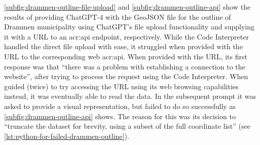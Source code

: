 \autoref{subfig:drammen-outline-file-upload} and \autoref{subfig:drammen-outline-api} show the results of providing ChatGPT-4 with the GeoJSON file for the outline of Drammen municipality using ChatGPT's file upload functionality and supplying it with a URL to an \acrshort{acr:api} endpoint, respectively. While the Code Interpreter handled the direct file upload with ease, it struggled when provided with the URL to the corresponding web \acrshort{acr:api}. When provided with the URL, its first response was that \enquote{there was a problem with establishing a connection to the website}, after trying to process the request using the Code Interpreter. When guided (twice) to try accessing the URL using its web browsing capabilities instead, it was eventually able to read the data. In the subsequent prompt it was asked to provide a visual representation, but failed to do so successfully as \autoref{subfig:drammen-outline-api} shows. The reason for this was its decision to \enquote{truncate the dataset for brevity, using a subset of the full coordinate list} (see \autoref{lst:python-for-failed-drammen-outline}).

